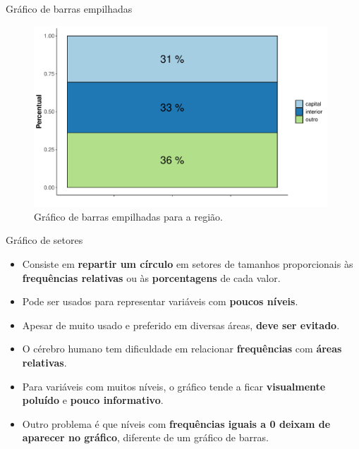 \documentclass[
  ignorenonframetext,
  serif,
  professionalfont,
  usenames,
  dvipsnames,
  aspectratio = 169]{beamer}
\providecommand{\tightlist}{%
  \setlength{\itemsep}{0pt}\setlength{\parskip}{0pt}}
\renewcommand{\tightlist}{%
  \setlength{\itemsep}{0\baselineskip}
  \setlength{\parskip}{0.25\baselineskip}
}
\begin{document}
\begin{frame}{Gráfico de barras empilhadas}
\label{gruxe1fico-de-barras-empilhadas}
\begin{figure}

{\centering \includegraphics[width=11cm]{encontro1_files/figure-beamer/unnamed-chunk-43-1} 

}

\caption{Gráfico de barras empilhadas para a região.}\label{fig:unnamed-chunk-43}
\end{figure}
\end{frame}

\begin{frame}{Gráfico de setores}
\label{gruxe1fico-de-setores}
\begin{itemize}
\tightlist
\item
  Consiste em \textbf{repartir um círculo} em setores de tamanhos
  proporcionais às \textbf{frequências relativas} ou às
  \textbf{porcentagens} de cada valor.
\item
  Pode ser usados para representar variáveis com \textbf{poucos níveis}.
\item
  Apesar de muito usado e preferido em diversas áreas,
  \textbf{deve ser evitado}.
\item
  O cérebro humano tem dificuldade em relacionar \textbf{frequências}
  com \textbf{áreas relativas}.
\item
  Para variáveis com muitos níveis, o gráfico tende a ficar
  \textbf{visualmente poluído} e \textbf{pouco informativo}.
\item
  Outro problema é que níveis com
  \textbf{frequências iguais a 0 deixam de aparecer no gráfico},
  diferente de um gráfico de barras.
\end{itemize}
\end{frame}
\end{document}
